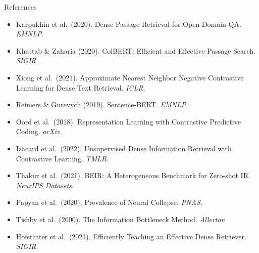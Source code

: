 \documentclass[aspectratio=169]{beamer}
\begin{document}
\begin{frame}{References}
\footnotesize
\begin{itemize}
    \item Karpukhin et al.\ (2020). Dense Passage Retrieval for Open-Domain QA. \textit{EMNLP}.
    \item Khattab \& Zaharia (2020). ColBERT: Efficient and Effective Passage Search. \textit{SIGIR}.
    \item Xiong et al.\ (2021). Approximate Nearest Neighbor Negative Contrastive Learning for Dense Text Retrieval. \textit{ICLR}.
    \item Reimers \& Gurevych (2019). Sentence-BERT. \textit{EMNLP}.
    \item Oord et al.\ (2018). Representation Learning with Contrastive Predictive Coding. \textit{arXiv}.
    \item Izacard et al.\ (2022). Unsupervised Dense Information Retrieval with Contrastive Learning. \textit{TMLR}.
    \item Thakur et al.\ (2021). BEIR: A Heterogeneous Benchmark for Zero-shot IR. \textit{NeurIPS Datasets}.
    \item Papyan et al.\ (2020). Prevalence of Neural Collapse. \textit{PNAS}.
    \item Tishby et al.\ (2000). The Information Bottleneck Method. \textit{Allerton}.
    \item Hofst\"atter et al.\ (2021). Efficiently Teaching an Effective Dense Retriever. \textit{SIGIR}.
\end{itemize}
\end{frame}
\end{document}
